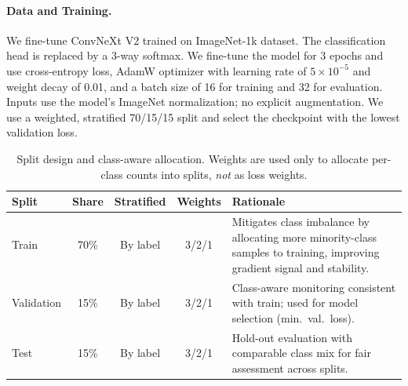 
\paragraph{Data and Training.} We fine-tune ConvNeXt V2 trained on ImageNet-1k dataset. The classification head is replaced by a 3-way softmax. We fine-tune the model for 3 epochs and use cross-entropy loss, AdamW optimizer with learning rate of $5\times10^{-5}$ and weight decay of 0.01, and a batch size of 16 for training and 32 for evaluation. Inputs use the model’s ImageNet normalization; no explicit augmentation. We use a weighted, stratified 70/15/15 split and select the checkpoint with the lowest validation loss.

\begin{table}[h!]
\centering
\small
\begin{tabular}{lccc p{6.8cm}}
\toprule
\textbf{Split} & \textbf{Share} & \textbf{Stratified} & \textbf{Weights} & \textbf{Rationale} \\
\midrule
Train       & 70\% & By label & 3/2/1 & Mitigates class imbalance by allocating more minority-class samples to training, improving gradient signal and stability. \\
Validation  & 15\% & By label & 3/2/1 & Class-aware monitoring consistent with train; used for model selection (min.\ val.\ loss). \\
Test        & 15\% & By label & 3/2/1 & Hold-out evaluation with comparable class mix for fair assessment across splits. \\
\bottomrule
\end{tabular}
\caption{Split design and class-aware allocation. Weights are used only to allocate per-class counts into splits, \emph{not} as loss weights.}
\label{tab:splits}
\end{table}


